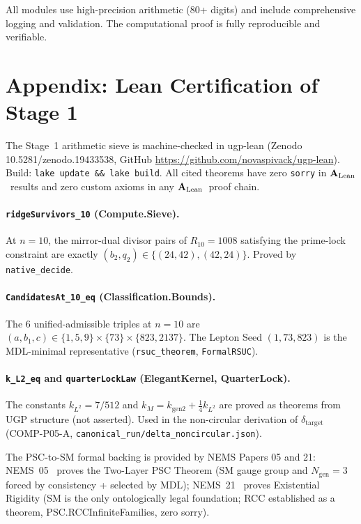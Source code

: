 \documentclass[11pt,twocolumn]{article}
\theoremstyle{remark}
\newcommand{\CatAL}{\ensuremath{\textbf{A}_{\rm Lean}}}
\begin{document}
All modules use high-precision arithmetic (80+ digits) and include comprehensive logging and validation. The computational proof is fully reproducible and verifiable.

\appendix
\section*{Appendix: Lean Certification of Stage 1}
\label{app:lean}

The Stage~1 arithmetic sieve is machine-checked in ugp-lean
(Zenodo 10.5281/\allowbreak zenodo.19433538,
GitHub \url{https://github.com/novaspivack/ugp-lean}).
Build: \texttt{lake update \&\& lake build}. All cited theorems have
zero \texttt{sorry} in \CatAL\ results and zero custom axioms in any \CatAL\ proof chain.

\paragraph{\texttt{ridgeSurvivors\_10} (Compute.Sieve).}
At $n=10$, the mirror-dual divisor pairs of $R_{10}=1008$ satisfying
the prime-lock constraint are exactly $(b_2,q_2)\in\{(24,42),(42,24)\}$.
Proved by \texttt{native\_decide}.

\paragraph{\texttt{CandidatesAt\_10\_eq} (Classification.Bounds).}
The 6 unified-admissible triples at $n=10$ are
$(a,b_1,c)\in\{1,5,9\}\times\{73\}\times\{823,2137\}$.
The Lepton Seed $(1,73,823)$ is the MDL-minimal representative
(\texttt{rsuc\_theorem}, \texttt{FormalRSUC}).

\paragraph{\texttt{k\_L2\_eq} and \texttt{quarterLockLaw} (ElegantKernel, QuarterLock).}
The constants $k_{L^2}=7/512$ and $k_M = k_{\text{gen2}} + \frac{1}{4}k_{L^2}$
are proved as theorems from UGP structure (not asserted).
Used in the non-circular derivation of $\delta_{\text{target}}$
(COMP-P05-A, \texttt{canonical\_run/delta\_noncircular.json}).

The PSC-to-SM formal backing is provided by NEMS Papers 05 and 21:
NEMS~05~\cite{SpivackPSCOpt} proves the Two-Layer PSC Theorem (SM gauge group
and $N_{\text{gen}}=3$ forced by consistency + selected by MDL);
NEMS~21~\cite{SpivackExistentialRigidity} proves Existential Rigidity
(SM is the only ontologically legal foundation; RCC established as a theorem, PSC.RCCInfiniteFamilies, zero sorry).
\end{document}
